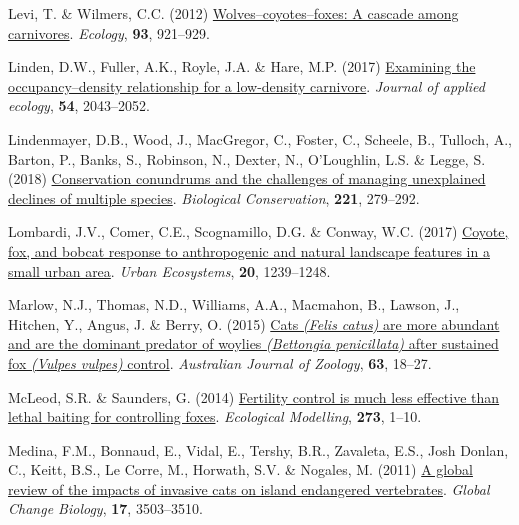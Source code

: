 \documentclass[preprint, 3p, authoryear]{elsarticle} %
\newlength{\cslhangindent}
\newlength{\cslentryspacingunit} %
\newenvironment{CSLReferences}[2] %
 {%
  \setlength{\parindent}{0pt}
  \ifodd #1
  \let\oldpar\par
  \def\par{\hangindent=\cslhangindent\oldpar}
  \fi
  \setlength{\parskip}{#2\cslentryspacingunit}
 }%
 {}
\begin{document}
\begin{CSLReferences}{1}{0}
\leavevmode{}%
Levi, T. \& Wilmers, C.C. (2012) \href{https://doi.org/10.1890/11-0165.1}{Wolves--coyotes--foxes: A cascade among carnivores}. \emph{Ecology}, \textbf{93}, 921--929.

\leavevmode{}%
Linden, D.W., Fuller, A.K., Royle, J.A. \& Hare, M.P. (2017) \href{https://doi.org/10.1111/1365-2664.12883}{Examining the occupancy--density relationship for a low-density carnivore}. \emph{Journal of applied ecology}, \textbf{54}, 2043--2052.

\leavevmode{}%
Lindenmayer, D.B., Wood, J., MacGregor, C., Foster, C., Scheele, B., Tulloch, A., Barton, P., Banks, S., Robinson, N., Dexter, N., O'Loughlin, L.S. \& Legge, S. (2018) \href{https://doi.org/10.1016/j.biocon.2018.03.007}{Conservation conundrums and the challenges of managing unexplained declines of multiple species}. \emph{Biological Conservation}, \textbf{221}, 279--292.

\leavevmode{}%
Lombardi, J.V., Comer, C.E., Scognamillo, D.G. \& Conway, W.C. (2017) \href{https://doi.org/10.1007/s11252-017-0676-z}{Coyote, fox, and bobcat response to anthropogenic and natural landscape features in a small urban area}. \emph{Urban Ecosystems}, \textbf{20}, 1239--1248.

\leavevmode{}%
Marlow, N.J., Thomas, N.D., Williams, A.A., Macmahon, B., Lawson, J., Hitchen, Y., Angus, J. \& Berry, O. (2015) \href{https://doi.org/10.1071/ZO14024}{Cats \emph{({Felis catus})} are more abundant and are the dominant predator of woylies \emph{({Bettongia penicillata})} after sustained fox \emph{({Vulpes vulpes})} control}. \emph{{A}ustralian Journal of Zoology}, \textbf{63}, 18--27.

\leavevmode{}%
McLeod, S.R. \& Saunders, G. (2014) \href{https://doi.org/10.1016/j.ecolmodel.2013.10.016}{Fertility control is much less effective than lethal baiting for controlling foxes}. \emph{Ecological Modelling}, \textbf{273}, 1--10.

\leavevmode{}%
Medina, F.M., Bonnaud, E., Vidal, E., Tershy, B.R., Zavaleta, E.S., Josh Donlan, C., Keitt, B.S., Le Corre, M., Horwath, S.V. \& Nogales, M. (2011) \href{https://doi.org/10.1111/j.1365-2486.2011.02464.x}{A global review of the impacts of invasive cats on island endangered vertebrates}. \emph{Global Change Biology}, \textbf{17}, 3503--3510.


\end{CSLReferences}
\end{document}
